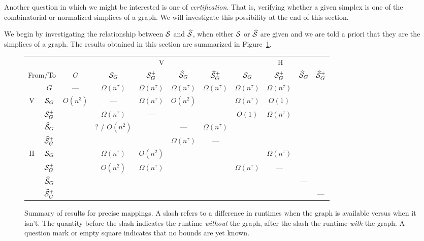 Another question in which we might be interested is one of \emph{certification}. That is, verifying whether  a given simplex is one of the combinatorial or normalized simplices of a graph. We will investigate  this possibility at  the end of this  section. 

We begin by investigating the relationship between $\mathcal{S}$ and $\widehat{\mathcal{S}}$, when either  $\mathcal{S}$ or $\widehat{\mathcal{S}}$ are given and we are told a priori that they are the simplices of a graph. The results obtained  in this section are summarized in Figure~\ref{fig:mapping_results}. 

\begin{figure}
	\centering
	\renewcommand{\arraystretch}{1.5}	\begin{tabular}{|c|c|c|c|c|c|c|c|c|c|c|}
		\hline 
		\multicolumn{3}{|c|}{} & \multicolumn{4}{c|}{\textsf{V}} & \multicolumn{4}{c|}{\textsf{H}}\\
	\cline{3-11} 
\multicolumn{2}{|r|}{From/To} & $G$ & $\mathcal{S}_G$ & $\mathcal{S}_G^+$ & $\widehat{\mathcal{S}}_G$ & $\widehat{\mathcal{S}}_G^+$ & $\mathcal{S}_G$ & $\mathcal{S}_G^+$ & $\widehat{\mathcal{S}}_G$ & $\widehat{\mathcal{S}}_G^+$ \\
\cline{2-11} 
& $G$ & --- &$\Omega(n^\tau)$ &$\Omega(n^\tau)$ &$\Omega(n^\tau)$ &$\Omega(n^\tau)$ & $\Omega(n^\tau)$ & $\Omega(n^\tau)$ &  & \\
\hline 
\multirow{4}{0.4cm}{\textsf{V}} & $\mathcal{S}_G$ & $O(n^3)$ & --- & $\Omega(n^\tau)$ & $O(n^2)$ & & $\Omega(n^\tau)$ & $O(1)$ & & \\
\cline{2-11}
& $\mathcal{S}_G^+$ & & $\Omega(n^\tau)$ & --- & & & $O(1)$ &$\Omega(n^\tau)$ & & \\
\cline{2-11}
& $\widehat{\mathcal{S}}_G$ & & ?  / $O(n^2)$ &  & --- & $\Omega(n^\tau)$ & & & &\\
\cline{2-11}
& $\widehat{\mathcal{S}}_G^+$ & & & &$\Omega(n^\tau)$ & --- & & & & \\
\hline 
\multirow{4}{0.4cm}{\textsf{H}} & $\mathcal{S}_G$ & & $\Omega(n^\tau)$ & $O(n^2)$ & & &--- & $\Omega(n^\tau)$& & \\
\cline{2-11}
& $\mathcal{S}_G^+$ & & $O(n^2)$ & $\Omega(n^\tau)$ & & &$\Omega(n^\tau)$ & --- & & \\
\cline{2-11}
& $\widehat{\mathcal{S}}_G$ & & & & &  & & & --- &\\
\cline{2-11}
& $\widehat{\mathcal{S}}_G^+$ & & & & & & & & & --- \\
\hline 
	\end{tabular}
	\renewcommand{\arraystretch}{1}
\caption{Summary of results for precise mappings. A slash refers to a difference in runtimes when the graph is available versus when it isn't. The quantity before the slash indicates the runtime \emph{without} the graph, after the slash the runtime \emph{with} the graph. A question mark or empty square indicates that no bounds are yet known. }
\label{fig:mapping_results}
\end{figure}

